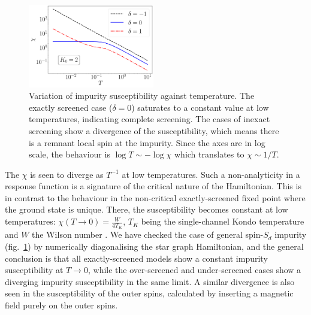 \documentclass[reprint,prb,superscriptaddress]{revtex4-2}
\begin{document}
\begin{figure}[!htpb]
\centering
\includegraphics[width=0.49\textwidth]{CentralFieldChiPowerlaw.pdf}
\caption{Variation of impurity susceptibility against temperature. The exactly screened case ($\delta=0$) saturates to a constant value at low temperatures, indicating complete screening. The cases of inexact screening show a divergence of the susceptibility, which means there is a remnant local spin at the impurity. Since the axes are in log scale, the behaviour is $\log T \sim -\log \chi$ which translates to $\chi \sim 1/T$.  }
\label{fig:suseptibility_impurity}
\end{figure}

The \(\chi\) is seen to diverge as \(T^{-1}\) at low temperatures.
Such a non-analyticity in a response function is {\color{red}a signature of the critical nature of the Hamiltonian. This is} in contrast to the behaviour in the {\color{red}non-critical} exactly-screened fixed point where the ground state is unique.
There, the susceptibility becomes constant at low temperatures: \(\chi(T\to 0) = \frac{W}{4 T_K}\), \(T_K\) being the single-channel Kondo temperature and \(W\) the Wilson number \cite{wilson1975renormalization,nozieres1974fermi,bullaNRGreview,kondo_urg}.
We have checked the case of general spin-\(S_{d}\) impurity (fig.~\ref{fig:suseptibility_impurity}) by {\color{blue}numerically diagonalising the star graph Hamiltonian}, and the general conclusion is that all exactly-screened models show a constant impurity susceptibility at \(T \to 0\), while the over-screened and under-screened cases show a diverging impurity susceptibility in the same limit.
A similar divergence is also seen in the susceptibility of the outer spins, calculated by inserting a magnetic field purely on the outer spins.
\end{document}
